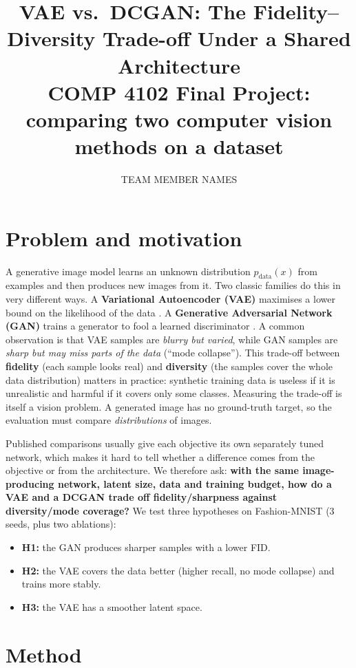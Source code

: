 \documentclass[11pt,letterpaper]{article}
\title{VAE vs.\ DCGAN: The Fidelity--Diversity Trade-off Under a Shared Architecture\\[0.6em]
  \large COMP 4102 Final Project: comparing two computer vision methods on a dataset}
\author{TEAM MEMBER NAMES}
\date{}
\begin{document}
\maketitle

\section{Problem and motivation}\label{sec:motivation}

A generative image model learns an unknown distribution
\(p_\text{data}(x)\) from examples and then produces new images from it.
Two classic families do this in very different ways. A
\textbf{Variational Autoencoder (VAE)} maximises a lower bound on the
likelihood of the data \cite{kingma2014}. A \textbf{Generative
Adversarial Network (GAN)} trains a generator to fool a learned
discriminator \cite{goodfellow2014}. A common observation is that VAE
samples are \emph{blurry but varied}, while GAN samples are \emph{sharp
but may miss parts of the data} (``mode collapse''). This trade-off
between \textbf{fidelity} (each sample looks real) and
\textbf{diversity} (the samples cover the whole data distribution)
matters in practice: synthetic training data is useless if it is
unrealistic and harmful if it covers only some classes. Measuring the
trade-off is itself a vision problem. A generated image has no
ground-truth target, so the evaluation must compare \emph{distributions}
of images.

Published comparisons usually give each objective its own separately
tuned network, which makes it hard to tell whether a difference comes
from the objective or from the architecture. We therefore ask:
\textbf{with the same image-producing network, latent size, data and
training budget, how do a VAE and a DCGAN trade off fidelity/sharpness
against diversity/mode coverage?} We test three hypotheses on
Fashion-MNIST (3 seeds, plus two ablations):

\begin{itemize}

\item
  \textbf{H1:} the GAN produces sharper samples with a lower FID.
\item
  \textbf{H2:} the VAE covers the data better (higher recall, no mode
  collapse) and trains more stably.
\item
  \textbf{H3:} the VAE has a smoother latent space.
\end{itemize}

\section{Method}\label{sec:method}
\end{document}

